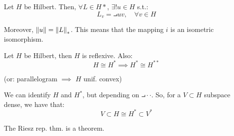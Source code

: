 \begin{ftheorem}
    Let $H$ be Hilbert. Then, $\forall L \in H*$, $\exists ! u \in H$ s.t.:
    $$L_v = \intprod{u}{v}, \quad \forall v \in H$$

    Moreover, $\left\|u\right\| = \left\|L\right\|_*$. This means that the mapping $i$ is an isometric
    isomorphism.
    
\end{ftheorem}

\begin{fcorollary}
    Let $H$ be Hilbert, then $H$ is reflexive. Also:
    $$H \cong H^* \implies H^* \cong H^{**}$$

    (or: parallelogram $\implies$ $H$ unif. convex)
\end{fcorollary}

\vspace{1em}

\begin{fremark}
    We can identify $H$ and $H^*$, but depending on $\intprod{\cdot}{\cdot}$. So, for
    a $V \subset H$ subspace dense, we have that:
    $$V \subset H \cong H^* \subset V^*$$
\end{fremark}

\begin{fremark}
    The Riesz rep. thm. is a  theorem.
\end{fremark}

